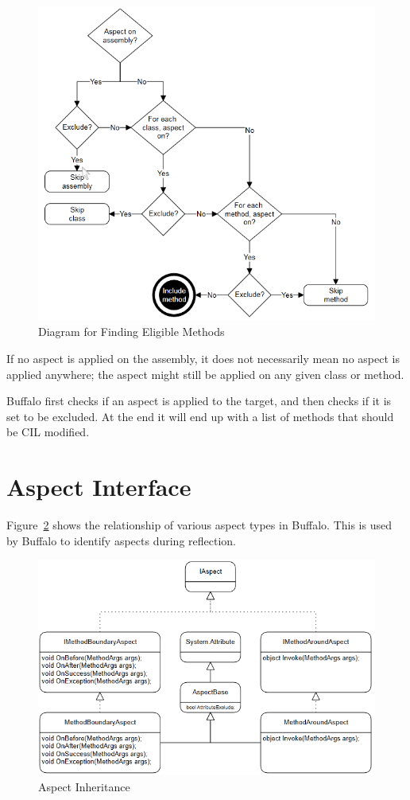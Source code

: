 \begin{figure}[H]
  \includegraphics[scale=1.0]{AspectLogicalInclusion2.PNG}
  \centering
  \caption{Diagram for Finding Eligible Methods\label{logical_inclusion}}
\end{figure}

If no aspect is applied on the assembly, it does not necessarily mean no aspect is applied anywhere; the aspect might still be applied on any given class or method.

Buffalo first checks if an aspect is applied to the target, and then checks if it is set to be excluded. At the end it will end up with a list of methods that should be CIL modified.

\section{Aspect Interface}

Figure~\ref{uml01} shows the relationship of various aspect types in Buffalo. This is used by Buffalo to identify aspects during reflection.

\begin{figure}[H]
  \includegraphics[scale=1.0]{Uml02.PNG}
  \centering
  \caption{Aspect Inheritance\label{uml01}}
\end{figure}

